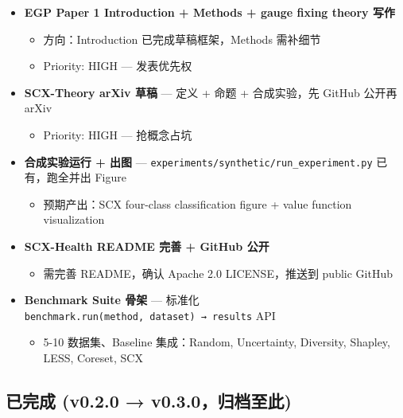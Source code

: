 \documentclass[
  12pt,
]{ctexart}
\providecommand{\tightlist}{%
  \setlength{\itemsep}{0pt}\setlength{\parskip}{0pt}}
\begin{document}
\begin{itemize}
\tightlist
\item[$\square$]
  \textbf{EGP Paper 1 Introduction + Methods + gauge fixing theory 写作}

  \begin{itemize}
  \tightlist
  \item
    方向：Introduction 已完成草稿框架，Methods 需补细节
  \item
    Priority: HIGH --- 发表优先权
  \end{itemize}
\item[$\square$]
  \textbf{SCX-Theory arXiv 草稿} --- 定义 + 命题 + 合成实验，先 GitHub
  公开再 arXiv

  \begin{itemize}
  \tightlist
  \item
    Priority: HIGH --- 抢概念占坑
  \end{itemize}
\item[$\square$]
  \textbf{合成实验运行 + 出图} ---
  \texttt{experiments/synthetic/run\_experiment.py} 已有，跑全并出
  Figure

  \begin{itemize}
  \tightlist
  \item
    预期产出：SCX four-class classification figure + value function
    visualization
  \end{itemize}
\item[$\square$]
  \textbf{SCX-Health README 完善 + GitHub 公开}

  \begin{itemize}
  \tightlist
  \item
    需完善 README，确认 Apache 2.0 LICENSE，推送到 public GitHub
  \end{itemize}
\item[$\square$]
  \textbf{Benchmark Suite 骨架} --- 标准化
  \texttt{benchmark.run(method,\ dataset)\ →\ results} API

  \begin{itemize}
  \tightlist
  \item
    5-10 数据集、Baseline 集成：Random, Uncertainty, Diversity, Shapley,
    LESS, Coreset, SCX
  \end{itemize}
\end{itemize}

\subsection{已完成 (v0.2.0 →
v0.3.0，归档至此)}\label{ux5df2ux5b8cux6210-v0.2.0-v0.3.0ux5f52ux6863ux81f3ux6b64}
\end{document}
